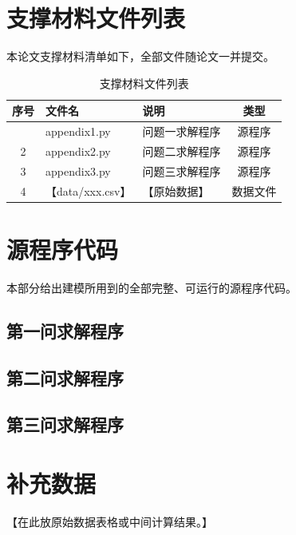 \documentclass[withoutpreface,bwprint]{cumcmthesis}
\begin{document}
\begin{appendices}
    \section{支撑材料文件列表}

    本论文支撑材料清单如下，全部文件随论文一并提交。

    {\renewcommand{\arraystretch}{1.38}
    \setlength{\tabcolsep}{6pt}
    \begin{longtable}{cllc}
        \caption{支撑材料文件列表}\\
        \toprule[1.5pt]
        序号 & 文件名 & 说明 & 类型 \\
        \midrule[1pt]
        \endfirsthead
        \endhead
        \bottomrule[1.5pt]
        \endlastfoot
        1 & appendix1.py & 问题一求解程序 & 源程序 \\
        2 & appendix2.py & 问题二求解程序 & 源程序 \\
        3 & appendix3.py & 问题三求解程序 & 源程序 \\
        4 & 【data/xxx.csv】 & 【原始数据】 & 数据文件 \\
    \end{longtable}}

    \section{源程序代码}

    本部分给出建模所用到的全部完整、可运行的源程序代码。

    \subsection{第一问求解程序}
    

    \subsection{第二问求解程序}
    

    \subsection{第三问求解程序}
    

    \section{补充数据}

    【在此放原始数据表格或中间计算结果。】

\end{appendices}
\end{document}
